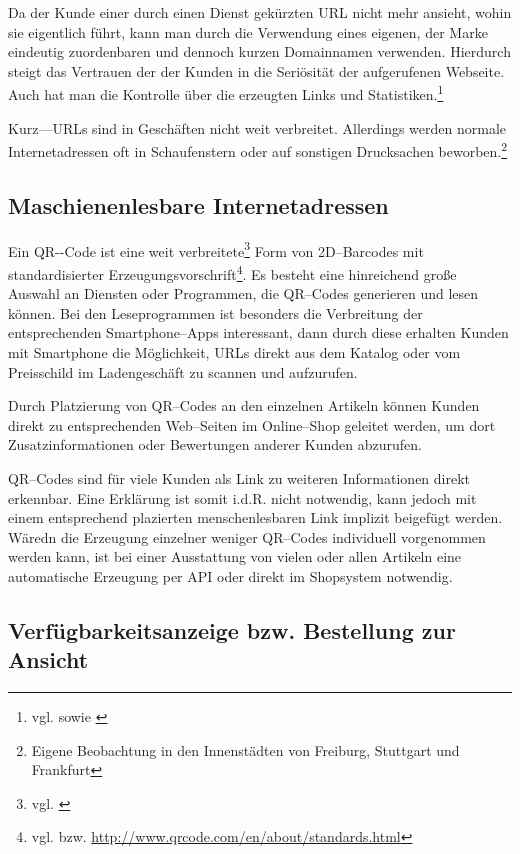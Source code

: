 Da der Kunde einer durch einen Dienst gekürzten \ac{URL} nicht mehr ansieht, wohin sie eigentlich führt, kann man durch die Verwendung eines eigenen, der Marke eindeutig zuordenbaren und dennoch kurzen Domainnamen verwenden. Hierdurch steigt das Vertrauen der der Kunden in die Seriösität der aufgerufenen Webseite. Auch hat man die Kontrolle über die erzeugten Links und Statistiken.\footnote{vgl. \cite{webmag} sowie \cite{gillen}}

Kurz––URLs sind in Geschäften nicht weit verbreitet. Allerdings werden normale Internetadressen oft in Schaufenstern oder auf sonstigen Drucksachen beworben.\footnote{Eigene Beobachtung in den Innenstädten von Freiburg, Stuttgart und Frankfurt}

\subsection{Maschienenlesbare Internetadressen}

Ein \ac{QR--Code} ist eine weit verbreitete\footnote{vgl. \cite{statista:qr}} Form von 2D--Barcodes mit standardisierter Erzeugungsvorschrift\footnote{vgl. \cite{iso:qr} bzw. \url{http://www.qrcode.com/en/about/standards.html}}. Es besteht eine hinreichend große Auswahl an Diensten oder Programmen, die QR--Codes generieren und lesen können. Bei den Leseprogrammen ist besonders die Verbreitung der entsprechenden Smartphone--Apps interessant, dann durch diese erhalten Kunden mit Smartphone die Möglichkeit, \ac{URL}s direkt aus dem Katalog oder vom Preisschild im Ladengeschäft zu scannen und aufzurufen. 

Durch Platzierung von QR--Codes an den einzelnen Artikeln können Kunden direkt zu entsprechenden Web--Seiten im Online--Shop geleitet werden, um dort Zusatzinformationen oder Bewertungen anderer Kunden abzurufen. 

QR--Codes sind für viele Kunden als Link zu weiteren Informationen direkt erkennbar. Eine Erklärung ist somit i.d.R. nicht notwendig, kann jedoch mit einem entsprechend plazierten menschenlesbaren Link implizit beigefügt werden. Wäredn die Erzeugung einzelner weniger QR--Codes individuell vorgenommen werden kann, ist bei einer Ausstattung von vielen oder allen Artikeln eine automatische Erzeugung per \ac{API} oder direkt im Shopsystem notwendig.

\subsection{Verfügbarkeitsanzeige bzw. Bestellung zur Ansicht}
\label{bza}

